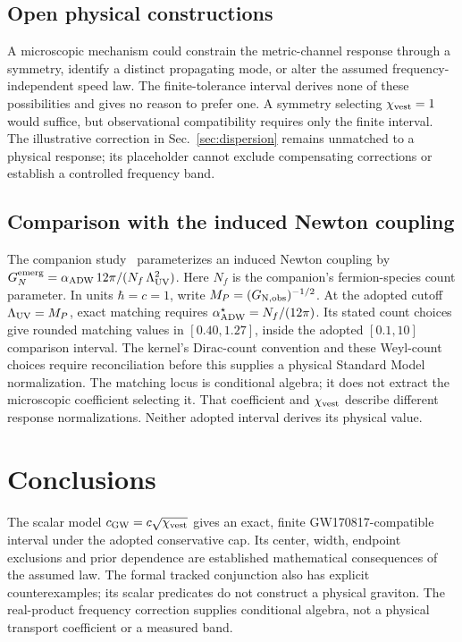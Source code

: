 \documentclass[aps,prd,twocolumn,showpacs,superscriptaddress,nofootinbib]{revtex4-2}
\newcommand{\cGW}{c_{\rm GW}}
\newcommand{\chivest}{\chi_{\rm vest}}
\newcommand{\GNemerg}{G_{N}^{\rm emerg}}
\newcommand{\Lambdauv}{\Lambda_{\rm UV}}
\newcommand{\Mpl}{M_{P}}
\newcommand{\Nf}{N_{f}}
\begin{document}
\subsection{Open physical constructions}

A microscopic mechanism could constrain the metric-channel response
through a symmetry, identify a distinct propagating mode, or alter
the assumed frequency-independent speed law. The finite-tolerance
interval derives none of these possibilities and gives no reason
to prefer one. A symmetry selecting $\chivest=1$ would suffice,
but observational compatibility requires only the finite interval.
The illustrative correction in Sec.~\ref{sec:dispersion} remains
unmatched to a physical response; its placeholder cannot exclude
compensating corrections or establish a controlled frequency band.

\subsection{Comparison with the induced Newton coupling}

The companion study~\cite{Roehm2026LinearizedEFE} parameterizes
an induced Newton coupling by
$\GNemerg=\alpha_{\rm ADW}\,12\pi/(\Nf\,\Lambdauv^2)$.
Here $\Nf$ is the companion's fermion-species count parameter.
In units $\hbar=c=1$, write
$\Mpl=(G_{\rm N,obs})^{-1/2}$.
At the adopted cutoff $\Lambdauv=\Mpl$, exact matching requires
$\alpha_{\rm ADW}^{\star}=\Nf/(12\pi)$.
Its stated count choices give rounded matching values in
$[0.40,1.27]$, inside the adopted $[0.1,10]$ comparison interval.
The kernel's Dirac-count convention and these Weyl-count choices
require reconciliation before this supplies a physical Standard
Model normalization. The matching locus is conditional algebra;
it does not extract the microscopic coefficient selecting it.
That coefficient and $\chivest$ describe different response
normalizations. Neither adopted interval derives its physical value.

\section{Conclusions}
\label{sec:conclusions}

The scalar model $\cGW=c\sqrt{\chivest}$ gives an exact,
finite GW170817-compatible interval under the adopted conservative
cap. Its center, width, endpoint exclusions and prior dependence
are established mathematical consequences of the assumed law.
The formal tracked conjunction also has explicit counterexamples;
its scalar predicates do not construct a physical graviton.
The real-product frequency correction supplies conditional algebra,
not a physical transport coefficient or a measured band.
\end{document}
